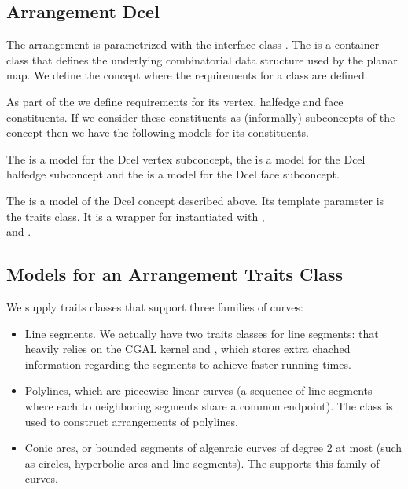 \subsection*{Arrangement Dcel}
The arrangement is parametrized with the interface class .
The  is a container class that defines the underlying
combinatorial data structure used by the planar map. We define the
concept  
where the requirements for a  class are defined.

As part of the  we define requirements for its vertex, halfedge and 
face constituents. If we consider these constituents as (informally) 
subconcepts of the  concept then we have the following models for
its constituents. 

The  is a model for the 
Dcel vertex subconcept,
the \mbox{} is a
model for the Dcel halfedge subconcept
and the \mbox{} is a
model for the Dcel face subconcept. 


The  is a model of the Dcel concept
described above. Its template parameter is the traits class.
It is a wrapper for  instantiated 
with \mbox{},\\
\mbox{} and 
\mbox{}.


\subsection*{Models for an Arrangement Traits Class} 
We supply traits classes that support three families of curves:
\begin{itemize}
\item Line segments. We actually have two traits classes for line segments: 
       that heavily relies on the CGAL
      kernel and , which stores
      extra chached information regarding the segments to achieve faster
      running times.
\item Polylines, which are piecewise linear curves (a sequence of line segments
      where each to neighboring segments share a common endpoint). The
       class is used to construct arrangements
      of polylines.
\item Conic arcs, or bounded segments of algenraic curves of degree 2 at most
      (such as circles, hyperbolic arcs and line segments). The
       supports this family of curves.
\end{itemize}

